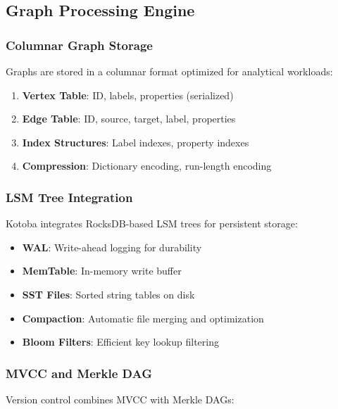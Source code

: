 \documentclass[11pt,a4paper]{article}
\begin{document}
\subsection{Graph Processing Engine}
\label{subsec:graph_engine}

\subsubsection{Columnar Graph Storage}
\label{subsubsec:columnar_storage}

Graphs are stored in a columnar format optimized for analytical workloads:

\begin{enumerate}
\item \textbf{Vertex Table}: ID, labels, properties (serialized)
\item \textbf{Edge Table}: ID, source, target, label, properties
\item \textbf{Index Structures}: Label indexes, property indexes
\item \textbf{Compression}: Dictionary encoding, run-length encoding
\end{enumerate}

\subsubsection{LSM Tree Integration}
\label{subsubsec:lsm_integration}

Kotoba integrates RocksDB-based LSM trees for persistent storage:

\begin{itemize}
\item \textbf{WAL}: Write-ahead logging for durability
\item \textbf{MemTable}: In-memory write buffer
\item \textbf{SST Files}: Sorted string tables on disk
\item \textbf{Compaction}: Automatic file merging and optimization
\item \textbf{Bloom Filters}: Efficient key lookup filtering
\end{itemize}

\subsubsection{MVCC and Merkle DAG}
\label{subsubsec:mvcc_merkle}

Version control combines MVCC with Merkle DAGs:
\end{document}
